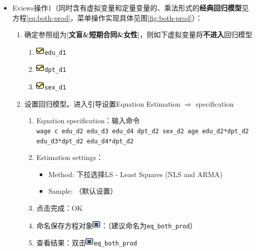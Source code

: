 \documentclass[12pt,(landscape,a4paper),(portrait,a4paper)]{article}
\providecommand{\tightlist}{%
  \setlength{\itemsep}{0pt}\setlength{\parskip}{0pt}}
\theoremstyle{definition}
\theoremstyle{definition}
\theoremstyle{definition}
\theoremstyle{remark}
\begin{document}
\begin{itemize}
\tightlist
\item
  Eviews操作1（同时含有虚拟变量和定量变量的、乘法形式的\textbf{经典回归模型}见方程\eqref{eq:both-prod}，菜单操作实现具体见图\ref{fig:both-prod}）：

  \begin{enumerate}
  \def\labelenumi{\arabic{enumi})}
  \tightlist
  \item
    确定参照组为{[}\textbf{文盲\&短期合同\&女性}{]}，则如下虚拟变量将\textbf{不进入}回归模型

    \begin{enumerate}
    \def\labelenumii{\alph{enumii}.}
    \tightlist
    \item
      \includegraphics{picture/object/Series.png}\texttt{edu\_d1}
    \item
      \includegraphics{picture/object/Series.png}\texttt{dpt\_d1}
    \item
      \includegraphics{picture/object/Series.png}\texttt{sex\_d1}
    \end{enumerate}
  \item
    设置回归模型。进入引导设置Equation Estimation \(\Rightarrow\)
    specification

    \begin{enumerate}
    \def\labelenumii{\alph{enumii}.}
    \tightlist
    \item
      Equation
      specification：输入命令\texttt{wage\ c\ edu\_d2\ edu\_d3\ edu\_d4\ dpt\_d2\ sex\_d2\ age\ edu\_d2*dpt\_d2\ edu\_d3*dpt\_d2\ edu\_d4*dpt\_d2}
    \item
      Estimation settings：

      \begin{itemize}
      \tightlist
      \item
        Method: 下拉选择LS - Least Squares (NLS and ARMA)
      \item
        Sample: （默认设置）
      \end{itemize}
    \item
      点击完成：OK
    \item
      命名保存方程对象\includegraphics{picture/object/Equation.png}：（建议命名为\texttt{eq\_both\_prod}）
    \item
      查看结果：双击\includegraphics{picture/object/Equation.png}\texttt{eq\_both\_prod}
    \end{enumerate}
  \end{enumerate}
\end{itemize}
\end{document}
